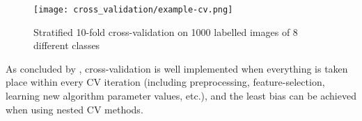 \begin{figure*}
\centering
  \texttt{[image: cross\_validation/example-cv.png]}
  \caption{Stratified 10-fold cross-validation on 1000 labelled images of 8 different classes}
  \label{fig:example}
\end{figure*}

As concluded by \citep{varma2006bias}, cross-validation is well implemented when everything is taken place within every CV iteration (including preprocessing, feature-selection, learning new algorithm parameter values, etc.), and the least bias can be achieved when using nested CV methods.
